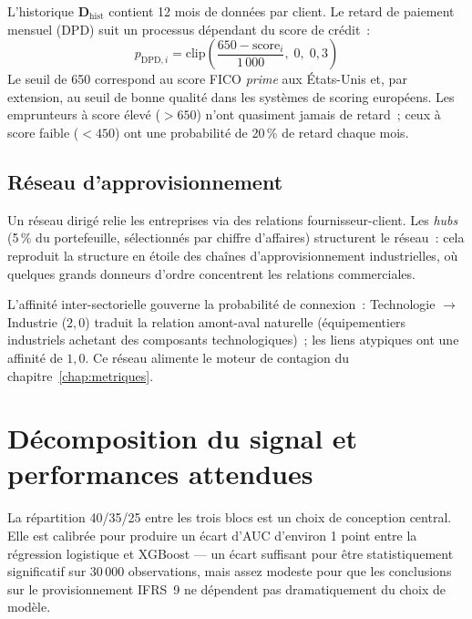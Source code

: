 \documentclass[12pt, a4paper, twoside, openright]{report}
\theoremstyle{definition}
\begin{document}
L'historique $\mathbf{D}_{\text{hist}}$ contient 12 mois de données par client.
Le retard de paiement mensuel (DPD) suit un processus dépendant du score de crédit~:
%
\begin{equation}
p_{\text{DPD},i} = \text{clip}\!\left(\frac{650 - \text{score}_i}{1\,000},\; 0,\; 0{,}3\right)
\end{equation}
%
Le seuil de 650 correspond au score FICO \emph{prime} aux États-Unis et, par extension, au seuil de bonne qualité dans les systèmes de scoring européens.
Les emprunteurs à score élevé ($> 650$) n'ont quasiment jamais de retard~; ceux à score faible ($< 450$) ont une probabilité de 20\,\% de retard chaque mois.

\subsection{Réseau d'approvisionnement}

Un réseau dirigé relie les entreprises via des relations fournisseur-client.
Les \emph{hubs} (5\,\% du portefeuille, sélectionnés par chiffre d'affaires) structurent le réseau~: cela reproduit la structure en étoile des chaînes d'approvisionnement industrielles, où quelques grands donneurs d'ordre concentrent les relations commerciales.

L'affinité inter-sectorielle gouverne la probabilité de connexion~: Technologie $\to$ Industrie ($2{,}0$) traduit la relation amont-aval naturelle (équipementiers industriels achetant des composants technologiques)~; les liens atypiques ont une affinité de $1{,}0$.
Ce réseau alimente le moteur de contagion du chapitre~\ref{chap:metriques}.


\section{Décomposition du signal et performances attendues}
\label{sec:donnees:signal}

La répartition 40/35/25 entre les trois blocs est un choix de conception central.
Elle est calibrée pour produire un écart d'AUC d'environ 1 point entre la régression logistique et XGBoost --- un écart suffisant pour être statistiquement significatif sur 30\,000 observations, mais assez modeste pour que les conclusions sur le provisionnement IFRS~9 ne dépendent pas dramatiquement du choix de modèle.
\end{document}
